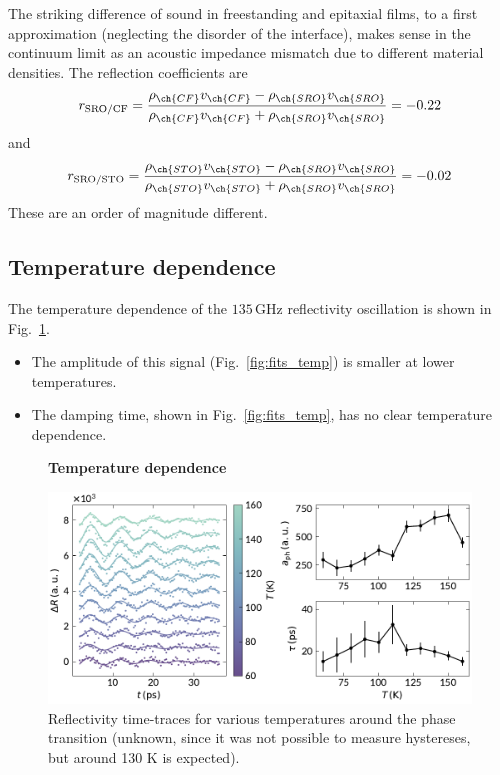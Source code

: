 \documentclass[nobib]{tufte-handout}
\begin{document}
The striking difference of sound in freestanding and epitaxial films, to a first approximation (neglecting the disorder of the interface), makes sense in the continuum limit as an acoustic impedance mismatch due to different material densities. The reflection coefficients are
\begin{equation}
	r_\mathrm{SRO/CF} = \frac{\rho_{\ch{CF}}v_{\ch{CF}} - \rho_{\ch{SRO}}v_{\ch{SRO}}}{\rho_{\ch{CF}}v_{\ch{CF}} + \rho_{\ch{SRO}}v_{\ch{SRO}}} = -0.22
\end{equation}
and
\begin{equation}
	r_\mathrm{SRO/STO} = \frac{\rho_{\ch{STO}}v_{\ch{STO}} - \rho_{\ch{SRO}}v_{\ch{SRO}}}{\rho_{\ch{STO}}v_{\ch{STO}} + \rho_{\ch{SRO}}v_{\ch{SRO}}} = -0.02
\end{equation}
These are an order of magnitude different.

\subsection{Temperature dependence}
The temperature dependence of the \( 135\,\mathrm{GHz} \) reflectivity oscillation is shown in Fig.~\ref{fig:temperature}.
\begin{itemize}
	\item The amplitude of this signal (Fig.~\ref{fig:fits_temp}) is smaller at lower temperatures.
	\item The damping time, shown in Fig.~\ref{fig:fits_temp}, has no clear temperature dependence.
\end{itemize}

\begin{figure}
	\centering
	\textbf{Temperature dependence}\par\medskip
	\includegraphics[width=\linewidth]{Graphics/traces_v_temperature.pdf}
	\caption{Reflectivity time-traces for various temperatures around the phase transition (unknown, since it was not possible to measure hystereses, but around 130 K is expected).}
	\label{fig:temperature}
\end{figure}
\end{document}
